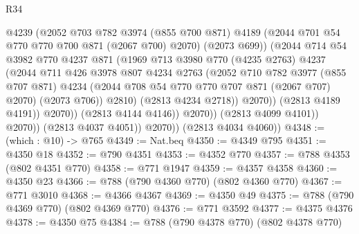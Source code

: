 \begin{lexlean}{R34}
\begin{coremodule}
                                @4239
                                (@2052
                                  @703
                                  @782
                                  @3974
                                  (@855 @700 @871)
                                  @4189
                                  (@2044 @701 @54 @770 @770 @700 @871 (@2067 @700) @2070)
                                  (@2073 @699))
                                (@2044
                                  @714
                                  @54
                                  @3982
                                  @770
                                  @4237
                                  @871
                                  (@1969
                                    @713
                                    @3980
                                    @770
                                    (@4235 @2763)
                                    @4237
                                    (@2044
                                      @711
                                      @426
                                      @3978
                                      @807
                                      @4234
                                      @2763
                                      (@2052
                                        @710
                                        @782
                                        @3977
                                        (@855 @707 @871)
                                        @4234
                                        (@2044 @708 @54 @770 @770 @707 @871 (@2067 @707) @2070)
                                        (@2073 @706))
                                      @2810)
                                    (@2813 @4234 @2718))
                                  @2070))
                              (@2813 @4189 @4191))
                            @2070))
                        (@2813 @4144 @4146))
                      @2070))
                  (@2813 @4099 @4101))
                @2070))
            (@2813 @4037 @4051))
          @2070))
      (@2813 @4034 @4060))
@4348 := (which : @10) -> @765
@4349 := Nat.beq
@4350 := @4349 @795
@4351 := @4350 @18
@4352 := @790 @4351
@4353 := @4352 @770
@4357 := @788 @4353 (@802 @4351 @770)
@4358 := @771 @1947
@4359 := @4357 @4358
@4360 := @4350 @23
@4366 := @788 (@790 @4360 @770) (@802 @4360 @770)
@4367 := @771 @3010
@4368 := @4366 @4367
@4369 := @4350 @49
@4375 := @788 (@790 @4369 @770) (@802 @4369 @770)
@4376 := @771 @3592
@4377 := @4375 @4376
@4378 := @4350 @75
@4384 := @788 (@790 @4378 @770) (@802 @4378 @770)

\end{coremodule}
\end{lexlean}
